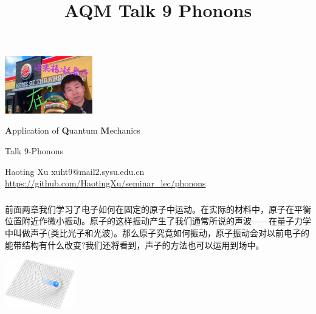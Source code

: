 \documentclass[CJK]{beamer}
\title{AQM Talk 9 Phonons}
\author{}
\date{}
\begin{document}
\begin{frame}
 
\begin{center}
\begin{Large}
  \bch
  \begin{center}
\includegraphics[width = 1.5in]{whopper}
\end{center}

{\bf A}pplication of {\bf Q}uantum {\bf M}echanics

{\vskip 0.1in}

Talk 9-Phonons

\ech
\end{Large}
\end{center}


\vskip 0.1in
\begin{center}
Haoting Xu
\vskip 0.1in
xuht9@mail2.sysu.edu.cn
\vskip 0.1in
{\tiny \url{https://github.com/HaotingXu/seminar_lec/phonons} }\\
\end{center}


\end{frame}
\begin{frame}\frametitle{\ech}
  \bch
  前面两章我们学习了电子如何在固定的原子中运动。在实际的材料中，原子在平衡位置附近作微小振动。原子的这样振动产生了我们通常所说的声波——在量子力学中叫做声子(类比光子和光波)。那么原子究竟如何振动，原子振动会对以前电子的能带结构有什么改变?我们还将看到，声子的方法也可以运用到场中。
  \begin{center}
    \includegraphics[width = 1.2in]{phonon}
  \end{center}
  \ech
\end{frame}
\end{document}
